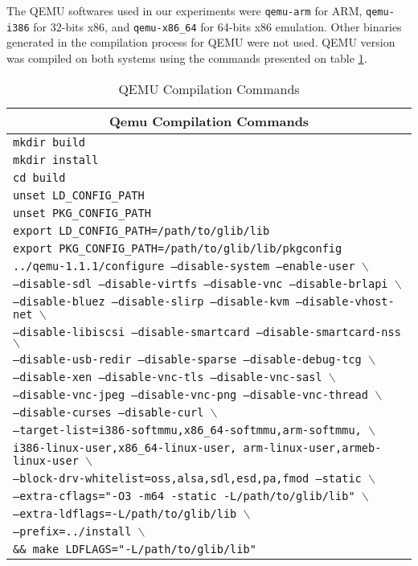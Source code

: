 \documentclass[11pt,twoside]{article}
\begin{document}
  The QEMU softwares used in our experiments were
  \texttt{qemu-arm} for ARM, \texttt{qemu-i386} for 32-bits x86,
  and \texttt{qemu-x86\_64} for 64-bits x86 emulation.
  Other binaries generated in the
  compilation process for QEMU were not used. 
  QEMU version \qemuversion \space was compiled on both systems
  using the commands presented on table \ref{tab:qemucompile}.
  \begin{table}
  \centering
  \begin{tabular}{|l|}
  \hline
  \multicolumn{1}{|c|}{\bf Qemu Compilation Commands} \\
  \hline
   \tt mkdir build \\
   \tt mkdir install \\
   \tt cd build \\
   \tt unset LD\_CONFIG\_PATH \\
   \tt unset PKG\_CONFIG\_PATH \\
   \tt export LD\_CONFIG\_PATH=/path/to/glib/lib \\
   \tt export PKG\_CONFIG\_PATH=/path/to/glib/lib/pkgconfig \\
   \tt ../qemu-1.1.1/configure --disable-system --enable-user
  $\backslash$\\
  \tt --disable-sdl --disable-virtfs --disable-vnc --disable-brlapi
  $\backslash$\\
  \tt --disable-bluez --disable-slirp --disable-kvm
  --disable-vhost-net
  $\backslash$\\
  \tt --disable-libiscsi --disable-smartcard --disable-smartcard-nss
  $\backslash$\\
  \tt --disable-usb-redir --disable-sparse --disable-debug-tcg
  $\backslash$\\
  \tt --disable-xen --disable-vnc-tls --disable-vnc-sasl
  $\backslash$\\
  \tt --disable-vnc-jpeg --disable-vnc-png --disable-vnc-thread
  $\backslash$\\
  \tt --disable-curses --disable-curl
  $\backslash$\\
  \tt --target-list=i386-softmmu,x86\_64-softmmu,arm-softmmu,
  $\backslash$\\
  \tt i386-linux-user,x86\_64-linux-user,%
  	  arm-linux-user,armeb-linux-user
  $\backslash$\\
  \tt --block-drv-whitelist=oss,alsa,sdl,esd,pa,fmod --static
  $\backslash$\\
  \tt --extra-cflags="-O3 -m64 -static -L/path/to/glib/lib"
  $\backslash$\\
  \tt --extra-ldflags=-L/path/to/glib/lib
  $\backslash$\\
  \tt --prefix=../install
  $\backslash$\\
  \tt \&\& make LDFLAGS="-L/path/to/glib/lib" \\
  \hline
  \end{tabular}
  \caption{QEMU Compilation Commands}
  \label{tab:qemucompile}
  \end{table}
\end{document}
